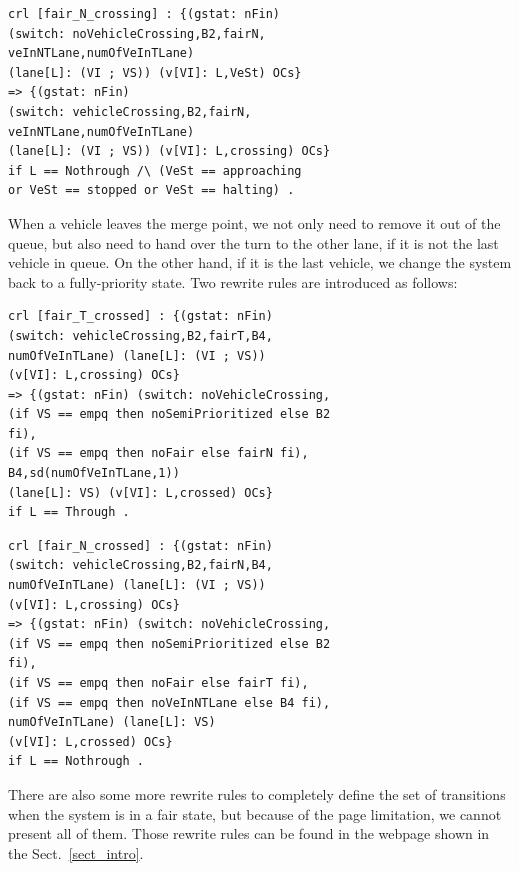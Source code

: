 \documentclass[10pt, conference, compsocconf]{IEEEtran}
\begin{document}
\begin{small}
	\begin{verbatim}
crl [fair_N_crossing] : {(gstat: nFin) 
(switch: noVehicleCrossing,B2,fairN,
veInNTLane,numOfVeInTLane) 
(lane[L]: (VI ; VS)) (v[VI]: L,VeSt) OCs} 
=> {(gstat: nFin) 
(switch: vehicleCrossing,B2,fairN,
veInNTLane,numOfVeInTLane) 
(lane[L]: (VI ; VS)) (v[VI]: L,crossing) OCs} 
if L == Nothrough /\ (VeSt == approaching 
or VeSt == stopped or VeSt == halting) .
\end{verbatim}
\end{small}

When a vehicle leaves the merge point, we not only need to remove it out of the queue, but also need to hand over the turn to the other lane, if it is not the last vehicle in queue.
On the other hand, if it is the last vehicle, we change the system back to a fully-priority state.
Two rewrite rules are introduced as follows:

\begin{small}
\begin{verbatim}
crl [fair_T_crossed] : {(gstat: nFin) 
(switch: vehicleCrossing,B2,fairT,B4,
numOfVeInTLane) (lane[L]: (VI ; VS)) 
(v[VI]: L,crossing) OCs} 
=> {(gstat: nFin) (switch: noVehicleCrossing,
(if VS == empq then noSemiPrioritized else B2 
fi), 
(if VS == empq then noFair else fairN fi), 
B4,sd(numOfVeInTLane,1)) 
(lane[L]: VS) (v[VI]: L,crossed) OCs} 
if L == Through .
\end{verbatim}
\end{small}

\begin{small}
	\begin{verbatim}
crl [fair_N_crossed] : {(gstat: nFin) 
(switch: vehicleCrossing,B2,fairN,B4,
numOfVeInTLane) (lane[L]: (VI ; VS)) 
(v[VI]: L,crossing) OCs} 
=> {(gstat: nFin) (switch: noVehicleCrossing,
(if VS == empq then noSemiPrioritized else B2 
fi), 
(if VS == empq then noFair else fairT fi), 
(if VS == empq then noVeInNTLane else B4 fi),
numOfVeInTLane) (lane[L]: VS) 
(v[VI]: L,crossed) OCs} 
if L == Nothrough .
\end{verbatim}
\end{small}

There are also some more rewrite rules to completely define the set of transitions when the system is in a fair state, but because of the page limitation, we cannot present all of them.
Those rewrite rules can be found in the webpage shown in the Sect.~\ref{sect_intro}.
\end{document}
